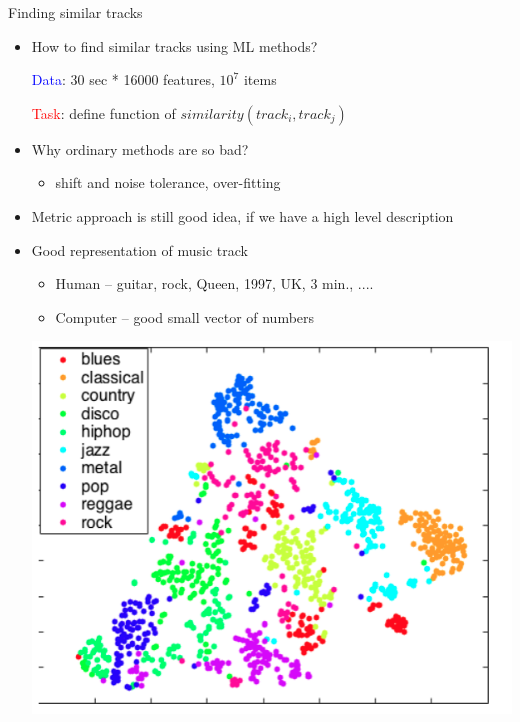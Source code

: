 \documentclass{beamer}
\begin{document}
\begin{frame}{Finding similar tracks}
	\begin{itemize}
		\item How to find similar tracks using ML methods?
			\begin{center}		  
				\textcolor{blue}{Data}: 30 sec * 16000 features, $10^7$ items
				
				\textcolor{red}{Task}: define function of $similarity(track_i, track_j)$
			\end{center}
		
		\item  Why ordinary methods are so bad?
			\begin{itemize}
				\item shift and noise tolerance, over-fitting 
			\end{itemize}
		
		\item Metric approach is still good idea, if we have a high level description
		\item Good representation of music track
		\begin{itemize}
			\item Human -- guitar, rock, Queen, 1997, UK, 3 min., .... 
			\item Computer -- good small vector of numbers  
		\end{itemize}
		
			\begin{center}
				\includegraphics[scale=0.2]{img/geners}
			\end{center}
		
	\end{itemize}
\end{frame}
\end{document}
